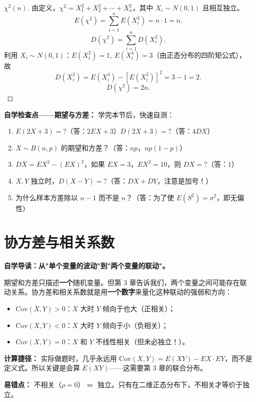 ﻿\documentclass[lang=cn,11pt]{elegantbook}
\begin{document}
\begin{proof}[\(\chi^2(n)\)]
由定义，\(\chi^2 = X_1^2+X_2^2+\cdots+X_n^2\)，其中 \(X_i \sim N(0,1)\) 且相互独立。
\[
E(\chi^2) = \sum_{i=1}^{n}E(X_i^2) = n\cdot 1 = n.
\]
\[
D(\chi^2) = \sum_{i=1}^{n}D(X_i^2).
\]
利用 \(X_i \sim N(0,1)\)：\(E(X_i^2)=1,\ E(X_i^4)=3\)（由正态分布的四阶矩公式），故
\[
D(X_i^2) = E(X_i^4) - [E(X_i^2)]^2 = 3 - 1 = 2.
\]
\[
D(\chi^2) = 2n.
\]
\end{proof}

\begin{note}
\textbf{自学检查点——期望与方差：} 学完本节后，快速自测：
\begin{enumerate}
    \item $E(2X+3)=?$（答：$2EX+3$）\quad $D(2X+3)=?$（答：$4DX$）
    \item $X\sim B(n,p)$ 的期望和方差？（答：$np$，$np(1-p)$）
    \item $DX=EX^2-(EX)^2$，如果 $EX=3$，$EX^2=10$，则 $DX=?$（答：$1$）
    \item $X,Y$ 独立时，$D(X-Y)=?$（答：$DX+DY$，注意是加号！）
    \item 为什么样本方差除以 $n-1$ 而不是 $n$？（答：为了使 $E(S^2)=\sigma^2$，即无偏性）
\end{enumerate}
\end{note}


\section{协方差与相关系数}

\begin{note}
\textbf{自学导读：从"单个变量的波动"到"两个变量的联动"。}

期望和方差只描述\textbf{一个}随机变量。但第 3 章告诉我们，两个变量之间可能存在联动关系。协方差和相关系数就是用\textbf{一个数字}来量化这种联动的强弱和方向：
\begin{itemize}
    \item $\text{Cov}(X,Y)>0$：$X$ 大时 $Y$ 倾向于也大（正相关）；
    \item $\text{Cov}(X,Y)<0$：$X$ 大时 $Y$ 倾向于小（负相关）；
    \item $\text{Cov}(X,Y)=0$：$X$ 和 $Y$ 不线性相关（但未必独立！）。
\end{itemize}

\textbf{计算捷径：} 实际做题时，几乎永远用 $\text{Cov}(X,Y)=E(XY)-EX\cdot EY$，而不是定义式。所以关键是会算 $E(XY)$——这需要第 3 章的联合分布。

\textbf{易错点：} 不相关（$\rho=0$）$\not\Rightarrow$ 独立。只有在二维正态分布下，不相关才等价于独立。
\end{note}
\end{document}

